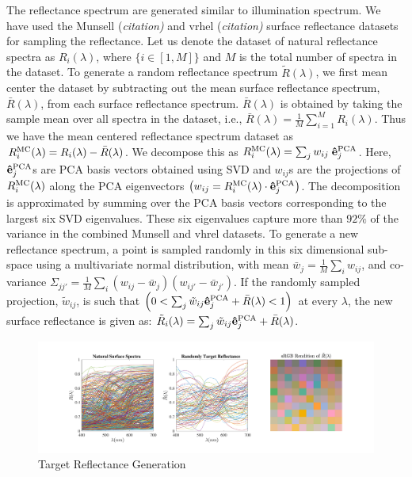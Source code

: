 \documentclass{jov}
\begin{document}
The reflectance spectrum are generated similar to illumination spectrum. 
We have used the Munsell {(\it citation)} and vrhel {(\it citation)} surface reflectance 
datasets for sampling the reflectance. Let us denote the dataset of natural 
reflectance spectra as $R_i(\lambda)$, where $\{i \in [1,M]\}$ 
and $M$ is the total number of spectra in the dataset. To generate 
a random reflectance spectrum $\tilde{R}(\lambda)$, 
we first mean center the dataset by subtracting out the 
mean surface reflectance spectrum, $\bar{R}(\lambda)$,
from each surface reflectance spectrum.
$\bar{R}(\lambda)$ is obtained by taking the sample 
mean over all spectra in the dataset, i.e.,
$\bar{R}(\lambda) = \frac{1}{M} \sum_{i=1}^M R_i(\lambda)$. 
Thus we have the mean centered reflectance 
spectrum dataset as $R_i^{\rm MC}(\lambda) =  R_i(\lambda)-\bar{R}(\lambda)$. 
We decompose this as $R_i^{\rm MC}(\lambda) = \sum_j{w_{ij} \; {\bf \hat{e}}_j^{\rm PCA}}$. Here,
${\bf \hat{e}}_j^{\rm PCA}$s are PCA basis vectors obtained using SVD 
and $w_{ij}$s are the projections of $R_i^{\rm MC}(\lambda)$ along the PCA eigenvectors 
$\left( w_{ij} = R_i^{\rm MC}(\lambda)\cdot {\bf \hat{e}}_j^{\rm PCA}\right)$. The 
decomposition is approximated by summing over the PCA basis 
vectors corresponding to the largest six SVD eigenvalues. These six eigenvalues capture 
more than $92\%$ of the variance in the combined Munsell and vhrel datasets. To generate 
a new reflectance spectrum, a point is sampled randomly in this 
six dimensional sub-space using a multivariate normal 
distribution, with mean $\bar{w}_j = \frac{1}{M}\sum_i w_{ij}$, 
and co-variance $\Sigma_{jj'} = \frac{1}{M} \sum_i \left(w_{ij} -\bar{w}_j\right)\left(w_{ij'} -\bar{w}_{j'}\right) $. If the randomly sampled projection, $\tilde{w}_{ij}$, is 
such that $\left( 0 < \sum_j \tilde{w}_{ij}{\bf \hat{e}}_j^{\rm PCA} + \bar{R}(\lambda)<1\right) $ at every $\lambda$, the new surface reflectance 
is given as: $\tilde{R}_i(\lambda) =\sum_j \tilde{w}_{ij}{\bf \hat{e}}_j^{\rm PCA} + \bar{R}(\lambda)$.

\begin{figure}
\centering
	\includegraphics[width=\textwidth]{../Figures/Figure14/Figure14.pdf}
    \caption{Target Reflectance Generation}
    \label{fig:targetGeneration}
\end{figure}
\end{document}
